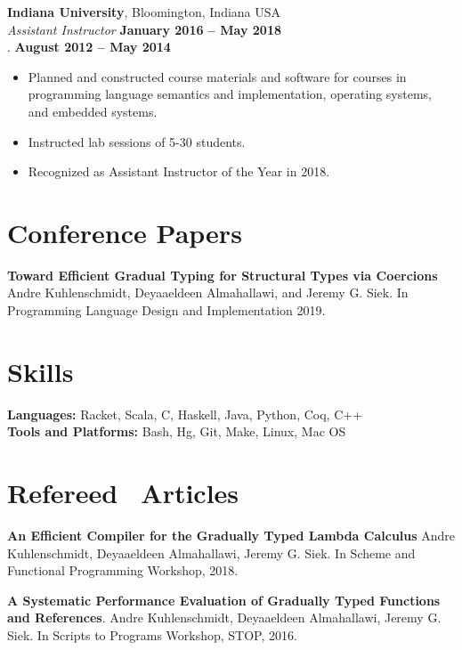 \documentclass[resmargin,line]{res}
\begin{document}
\begin{resume}
{\bf Indiana University}, Bloomington, Indiana USA\\
{\em Assistant Instructor} \hfill {\bf January 2016 -- May 2018}\\
{\color{white} . } \quad \hfill {\bf August 2012 -- May 2014}\\
%
\begin{itemize}
\vspace*{-.35cm}
\item Planned and constructed course materials and software for
  courses in programming language semantics and implementation,
  operating systems, and embedded systems.
\item Instructed lab sessions of 5-30 students.
\item Recognized as Assistant Instructor of the Year in 2018.
\end{itemize}
%

\section{\sc Conference Papers}
{\bf Toward Efficient Gradual Typing for Structural Types via Coercions}
Andre Kuhlenschmidt, Deyaaeldeen Almahallawi, and Jeremy G. Siek.
In Programming Language Design and Implementation 2019.

\section{\sc Skills}
{\bf Languages:} Racket, Scala, C, Haskell, Java, Python, Coq, C++\\
{\bf Tools and Platforms:} Bash, Hg, Git, Make, Linux, Mac OS

\pagebreak

\section{\sc Refereed \, Articles}

{\bf An Efficient Compiler for the Gradually Typed Lambda Calculus}
Andre Kuhlenschmidt, Deyaaeldeen Almahallawi, Jeremy G. Siek.
In Scheme and Functional Programming Workshop, 2018.

{\bf A Systematic Performance Evaluation of Gradually Typed Functions
  and References}.
Andre Kuhlenschmidt, Deyaaeldeen Almahallawi, Jeremy G. Siek.
In Scripts to Programs Workshop, STOP, 2016.


\end{resume}
\end{document}
